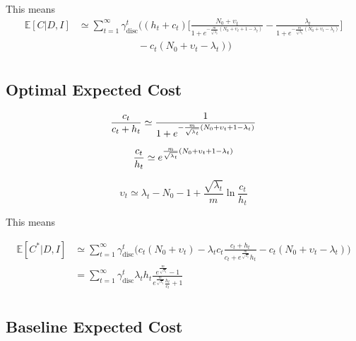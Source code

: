 This means
\begin{equation}
	\begin{split}
		\mathbb{E}[C|D,I] &\simeq  \sum_{t=1}^{\infty} \gamma_{\text{disc}}^{t} \bigg( 
		(h_t+c_t)\bigg[\frac{N_0 + \upsilon_t}{1+e^{-\frac{m}{\sqrt{\lambda_t}}(N_0+\upsilon_t+1-\lambda_t)}}- \frac{\lambda_t}{1+e^{-\frac{m}{\sqrt{\lambda_t}}(N_0+\upsilon_t-\lambda_t)}}\bigg]\\
		&\qquad\qquad\qquad
		- c_t(N_0 + \upsilon_t-\lambda_t)\bigg)\\
	\end{split}
\end{equation}

\subsection{Optimal Expected Cost}

\begin{equation}
	\frac{c_t}{c_t+h_t}\simeq\frac{1}{1+e^{-\frac{m}{\sqrt{\lambda_t}}(N_0+\upsilon_t+1-\lambda_t)}}\\
\end{equation}

\begin{equation}
	\frac{c_t}{h_t}\simeq e^{\frac{m}{\sqrt{\lambda_t}}(N_0+\upsilon_t+1-\lambda_t)}\\
\end{equation}

\begin{equation}
	\upsilon_t\simeq \lambda_t-N_0-1+\frac{\sqrt{\lambda_t}}{m}\ln\frac{c_t}{h_t} 
\end{equation}

This means

\begin{equation}
	\begin{split}
		\mathbb{E}[C^*|D,I] &\simeq \sum_{t=1}^{\infty} \gamma_{\text{disc}}^{t} \bigg( 
		c_t(N_0 + \upsilon_t)- \lambda_tc_t\frac{c_t+h_t}{c_t+e^{\frac{m}{\sqrt{\lambda_t}}}h_t}- c_t(N_0 + \upsilon_t-\lambda_t)\bigg)\\
		&= \sum_{t=1}^{\infty} \gamma_{\text{disc}}^{t} \lambda_th_t\frac{e^{\frac{m}{\sqrt{\lambda_t}}}-1}{e^{\frac{m}{\sqrt{\lambda_t}}}\frac{h_t}{c_t}+1}\\
	\end{split}
\end{equation}

\subsection{Baseline Expected Cost}

